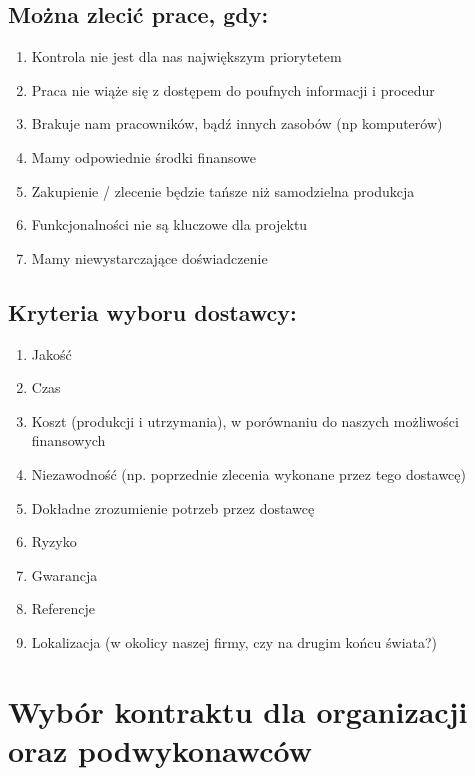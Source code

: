 \subsection*{Można zlecić prace, gdy:}
\begin{enumerate}
\item Kontrola nie jest dla nas największym priorytetem
\item Praca nie wiąże się z dostępem do poufnych informacji i procedur
\item Brakuje nam pracowników, bądź innych zasobów (np komputerów)
\item Mamy odpowiednie środki finansowe
\item Zakupienie / zlecenie będzie tańsze niż samodzielna produkcja
\item Funkcjonalności nie są kluczowe dla projektu
\item Mamy niewystarczające doświadczenie
\end{enumerate}

\subsection*{Kryteria wyboru dostawcy:}
\begin{enumerate}
\item Jakość
\item Czas
\item Koszt (produkcji i utrzymania), w porównaniu do naszych możliwości finansowych
\item Niezawodność (np. poprzednie zlecenia wykonane przez tego dostawcę)
\item Dokładne zrozumienie potrzeb przez dostawcę
\item Ryzyko
\item Gwarancja
\item Referencje
\item Lokalizacja (w okolicy naszej firmy, czy na drugim końcu świata?)
\end{enumerate}

\clearpage


\section{Wybór kontraktu dla organizacji oraz podwykonawców}

